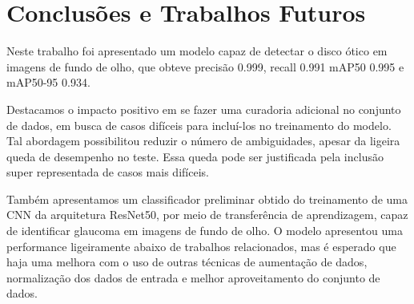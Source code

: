 \documentclass[12pt]{article}
\begin{document}
\section{Conclusões e Trabalhos Futuros}
\label{sec:conclusions}

Neste trabalho foi apresentado um modelo capaz de detectar o disco ótico em imagens de fundo de olho, que obteve precisão 0.999, recall 0.991 mAP50 0.995 e mAP50-95 0.934.

Destacamos o impacto positivo em se fazer uma curadoria adicional no conjunto de dados, em busca de casos difíceis para incluí-los no treinamento do modelo. Tal abordagem possibilitou reduzir o número de ambiguidades, apesar da ligeira queda de desempenho no teste. Essa queda pode ser justificada pela inclusão super representada de casos mais difíceis.

Também apresentamos um classificador preliminar obtido do treinamento de uma CNN da arquitetura ResNet50, por meio de transferência de aprendizagem, capaz de identificar glaucoma em imagens de fundo de olho. O modelo apresentou uma performance ligeiramente abaixo de trabalhos relacionados, mas é esperado que haja uma melhora com o uso de outras técnicas de aumentação de dados, normalização dos dados de entrada e melhor aproveitamento do conjunto de dados.






\bigskip


\end{document}
